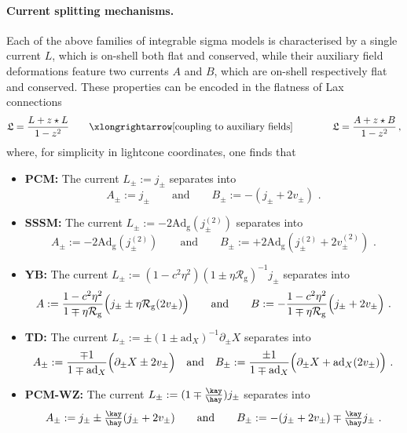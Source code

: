 \documentclass[12pt]{article}
\numberwithin{equation}{section}
\begin{document}
\paragraph{Current splitting mechanisms.} Each of the above families of integrable sigma models is characterised by a single current $L$, which is on-shell both flat and conserved, while their auxiliary field deformations feature two currents $A$ and $B$, which are on-shell respectively flat and conserved. These properties can be encoded in the flatness of Lax connections
\begin{equation}\label{current-splitting-mechanism}
\mathfrak{L}=\frac{L+z\star L}{1-z^2}
\qquad 
\xlongrightarrow[\text{coupling to auxiliary fields}]
\qquad \qquad 
\mathfrak{L}=\frac{A+z\star B}{1-z^2} \, ,
\end{equation}
where, for simplicity in lightcone coordinates, one finds that
\begin{itemize}
\item  \textbf{PCM:} The current $L_{\pm}:=j_{\pm}$ separates into
\begin{equation}
A_{\pm}:=j_{\pm} \qquad \text{and} \qquad B_{\pm}:=-(j_{\pm}+2v_{\pm}) \,\, .
\end{equation}
\item \textbf{SSSM:} The current $L_{\pm}:=-2\mathrm{Ad}_{\mathrm{g}}(j_{\pm}^{(2)})$ separates into
\begin{equation}
A_{\pm}:=-2\mathrm{Ad}_{\mathrm{g}}(j_{\pm}^{(2)}) \qquad \text{and} \qquad B_{\pm}:=+2\mathrm{Ad}_{\mathrm{g}}(j_{\pm}^{(2)}+2v_{\pm}^{(2)}) \,\, .
\end{equation}
\item \textbf{YB:} The current $L_{\pm}:=(1-c^2\eta^2)(1\pm \eta \mathcal{R}_{\mathrm{g}})^{-1}j_{\pm}$ separates into
\begin{equation}
A:=\frac{1-c^2\eta^2}{1\mp \eta \mathcal{R}_{\mathrm{g}}}\Bigl(j_{\pm}\pm\eta\mathcal{R}_{\mathrm{g}}(2v_{\pm})\Bigr) \qquad \text{and} \qquad B:=-\frac{1-c^2\eta^2}{1\mp \eta \mathcal{R}_{\mathrm{g}}}\Bigl(j_{\pm}+2v_{\pm}\Bigr) \,\, .
\end{equation}
\item \textbf{TD:} The current $L_{\pm}:=\pm(1\pm\mathrm{ad}_{X})^{-1}\partial_{\pm}X$ separates into
\begin{equation}
A_{\pm}:=\frac{\mp1}{1\mp \mathrm{ad}_{X}}\Bigl(\partial_{\pm}X\pm 2v_{\pm}\Bigr) \quad \text{and} \quad B_{\pm}:=\frac{\pm1}{1\mp \mathrm{ad}_{X}}\Bigl(\partial_{\pm}X+\mathrm{ad}_{X}(2v_{\pm})\Bigr) \,\, .
\end{equation}
\item \textbf{PCM-WZ:} The current $L_{\pm}:=(1\mp\tfrac{\kay}{\hay})j_{\pm} $ separates into 
\begin{equation}
A_{\pm}:=j_{\pm}\pm\tfrac{\kay}{\hay}(j_{\pm}+2v_{\pm}) \qquad \text{and} \qquad B_{\pm}:=-(j_{\pm}+2v_{\pm}) \mp \tfrac{\kay}{\hay}j_{\pm} \,\, .
\end{equation}
\end{itemize}
\end{document}
